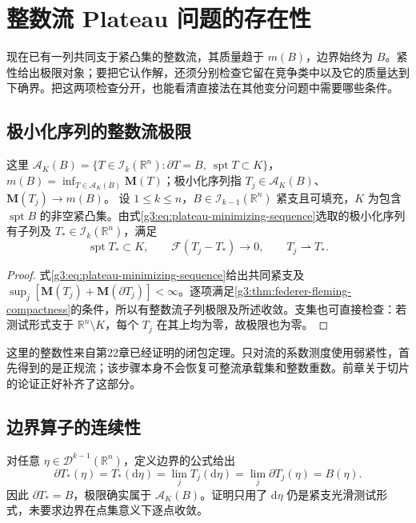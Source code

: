 
% 
% 

\section{整数流 Plateau 问题的存在性}
\label{g3:sec:2302}
现在已有一列共同支于紧凸集的整数流，其质量趋于 \(m(B)\)，边界始终为 \(B\)。紧性给出极限对象；要把它认作解，还须分别检查它留在竞争类中以及它的质量达到下确界。把这两项检查分开，也能看清直接法在其他变分问题中需要哪些条件。

\subsection{极小化序列的整数流极限}
\label{g3:subsec:2302:01}
\begin{proposition}\label{g3:prop:plateau-limit-integer}
	这里 \(\mathcal A_K(B)=\{T\in\mathcal I_k(\mathbb R^n):\partial T=B,\ \operatorname{spt}T\subset K\}\)，\(m(B)=\inf_{T\in\mathcal A_K(B)}\mathbf M(T)\)；极小化序列指 \(T_j\in\mathcal A_K(B)\)、\(\mathbf M(T_j)\to m(B)\)。
	设 \(1\le k\le n\)，\(B\in\mathcal I_{k-1}(\mathbb R^n)\) 紧支且可填充，\(K\) 为包含 \(\operatorname{spt}B\) 的非空紧凸集。由式\eqref{g3:eq:plateau-minimizing-sequence}选取的极小化序列有子列及 \(T_*\in\mathcal I_k(\mathbb R^n)\)，满足
	\[
		\operatorname{spt}T_*\subset K,\qquad
		\mathcal F(T_j-T_*)\longrightarrow0,
		\qquad T_j\rightharpoonup T_*.
	\]
\end{proposition}
\begin{proof}
	式\eqref{g3:eq:plateau-minimizing-sequence}给出共同紧支及
	\(\sup_j[\mathbf M(T_j)+\mathbf M(\partial T_j)]<\infty\)。逐项满足\cref{g3:thm:federer-fleming-compactness}的条件，所以有整数流子列极限及所述收敛。支集也可直接检查：若测试形式支于 \(\mathbb R^n\setminus K\)，每个 \(T_j\) 在其上均为零，故极限也为零。
\end{proof}

这里的整数性来自第22章已经证明的闭包定理。只对流的系数测度使用弱紧性，首先得到的是正规流；该步骤本身不会恢复可整流承载集和整数重数。前章关于切片的论证正好补齐了这部分。

\subsection{边界算子的连续性}
\label{g3:subsec:2302:02}
对任意 \(\eta\in\mathcal D^{k-1}(\mathbb R^n)\)，定义边界的公式给出
\begin{equation}\label{g3:eq:plateau-limit-boundary}
	\partial T_*(\eta)=T_*(\mathrm d\eta)
	=\lim_jT_j(\mathrm d\eta)
	=\lim_j\partial T_j(\eta)=B(\eta).
\end{equation}
因此 \(\partial T_*=B\)，极限确实属于 \(\mathcal A_K(B)\)。证明只用了 \(\mathrm d\eta\) 仍是紧支光滑测试形式，未要求边界在点集意义下逐点收敛。


